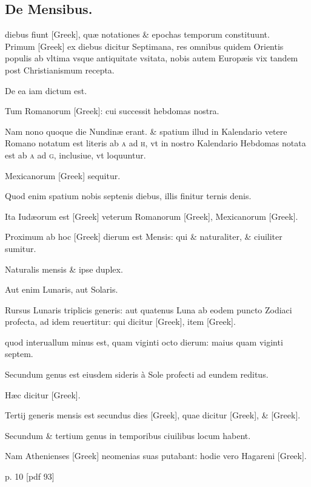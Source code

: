 \subsection{De Mensibus.}
\setcounter{parcount}{0}
\begin{parnumbers}

 diebus fiunt \textgreek{[Greek]}, quæ notationes \& epochas
temporum constituunt.
\\ \p
Primum \textgreek{[Greek]} ex diebus dicitur Septimana,
res omnibus quidem Orientis populis ab vltima vsque
antiquitate vsitata,
 nobis autem Europæis vix tandem post Christianismum
recepta.

De ea iam dictum est.

Tum Romanorum \textgreek{[Greek]}: cui
successit hebdomas nostra.

Nam nono quoque die Nundinæ erant.
\& spatium illud in Kalendario vetere Romano notatum est literis ab
\textsc{a} ad \textsc{h}, vt in nostro Kalendario Hebdomas
 notata est ab \textsc{a} ad \textsc{g}, inclusiue,
vt loquuntur.

Mexicanorum \textgreek{[Greek]} sequitur.

Quod
enim spatium nobis septenis diebus, illis finitur ternis denis.

Ita Iudæorum
est \textgreek{[Greek]} veterum Romanorum \textgreek{[Greek]}, Mexicanorum
\textgreek{[Greek]}.

Proximum ab hoc \textgreek{[Greek]} dierum est Mensis:
qui \& naturaliter, \& ciuiliter sumitur.

Naturalis mensis \& ipse duplex.

Aut enim Lunaris, aut Solaris.

Rursus Lunaris triplicis generis:
aut quatenus Luna ab eodem puncto Zodiaci profecta, ad idem
reuertitur: qui dicitur \textgreek{[Greek]}, item \textgreek{[Greek]}.

quod interuallum
minus est, quam viginti octo dierum: maius quam viginti septem.

Secundum genus est eiusdem sideris à Sole profecti ad eundem
reditus.

Hæc dicitur \textgreek{[Greek]}.

Tertij generis mensis est secundus
dies \textgreek{[Greek]}, quae dicitur \textgreek{[Greek]},
 \& \textgreek{[Greek]}.

Secundum \& tertium genus in temporibus ciuilibus locum habent.

Nam Athenienses \textgreek{[Greek]} neomenias suas putabant: hodie vero
Hagareni \textgreek{[Greek]}.

\end{parnumbers}
\clearpage
p. 10 [pdf 93]

